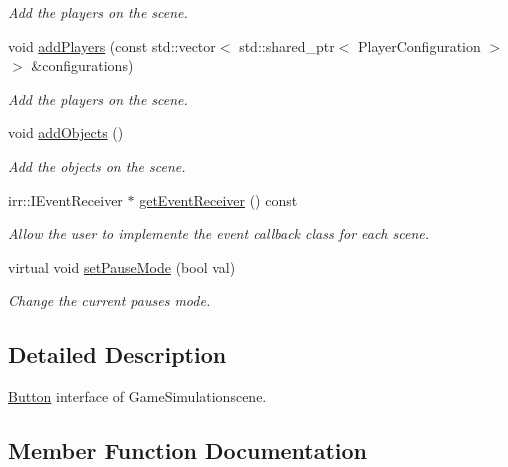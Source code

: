 \begin{DoxyCompactItemize}
\begin{DoxyCompactList}\small\item\em Add the players on the scene. \end{DoxyCompactList}\item 
\mbox{\label{classGameSimulationScene_a5712662af6ebc293ba8a58e5a717a921}} 
void \hyperlink{classGameSimulationScene_a5712662af6ebc293ba8a58e5a717a921}{add\+Players} (const std\+::vector$<$ std\+::shared\+\_\+ptr$<$ Player\+Configuration $>$ $>$ \&configurations)
\begin{DoxyCompactList}\small\item\em Add the players on the scene. \end{DoxyCompactList}\item 
\mbox{\label{classGameSimulationScene_a6bfca51ab0bb01f29c395aa3ab6448fc}} 
void \hyperlink{classGameSimulationScene_a6bfca51ab0bb01f29c395aa3ab6448fc}{add\+Objects} ()
\begin{DoxyCompactList}\small\item\em Add the objects on the scene. \end{DoxyCompactList}\item 
irr\+::\+I\+Event\+Receiver $\ast$ \hyperlink{classGameSimulationScene_a048b2a937caff3af7b4d54f8bd404ec1}{get\+Event\+Receiver} () const
\begin{DoxyCompactList}\small\item\em Allow the user to implemente the event callback class for each scene. \end{DoxyCompactList}\item 
virtual void \hyperlink{classGameSimulationScene_a34377bab69b7a81e50f3d2c42596c574}{set\+Pause\+Mode} (bool val)
\begin{DoxyCompactList}\small\item\em Change the current pause\textquotesingle{}s mode. \end{DoxyCompactList}\end{DoxyCompactItemize}


\subsection{Detailed Description}
\hyperlink{classButton}{Button} interface of Game\+Simulationscene. 

\subsection{Member Function Documentation}
\mbox{\label{classGameSimulationScene_a048b2a937caff3af7b4d54f8bd404ec1}} 
